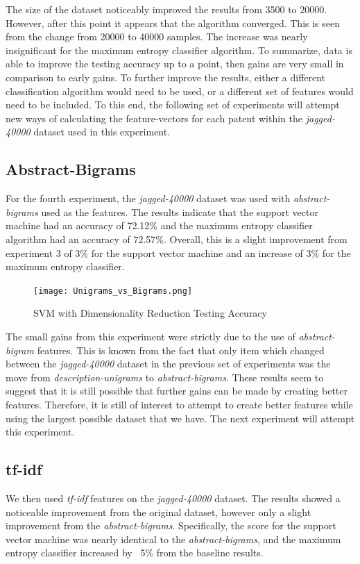 The size of the dataset noticeably improved the results from 3500 to 20000.  However, after this point it appears that the algorithm converged.  This is seen from the change from 20000 to 40000 samples.  The increase was nearly insignificant for the maximum entropy classifier algorithm.  To summarize, data is able to improve the testing accuracy up to a point, then gains are very small in comparison to early gains.  To further improve the results, either a different classification algorithm would need to be used, or a different set of features would need to be included.  To this end, the following set of experiments will attempt new ways of calculating the feature-vectors for each patent within the \emph{jagged-40000} dataset used in this experiment.

\subsection{Abstract-Bigrams}
For the fourth experiment, the \emph{jagged-40000} dataset was used with \emph{abstract-bigrams} used as the features.  The results indicate that the support vector machine had an accuracy of 72.12\% and the maximum entropy classifier algorithm had an accuracy of 72.57\%.  Overall, this is a slight improvement from experiment 3 of 3\% for the support vector machine and an increase of 3\% for the maximum entropy classifier.

\begin{figure}[!h]
\begin{center}
\caption{SVM with Dimensionality Reduction Testing Accuracy}
\texttt{[image: Unigrams\_vs\_Bigrams.png]}
\end{center}
\end{figure}

The small gains from this experiment were strictly due to the use of \emph{abstract-bigram} features.  This is known from the fact that only item which changed between the \emph{jagged-40000} dataset in the previous set of experiments was the move from \emph{description-unigrams} to \emph{abstract-bigrams}.  These results seem to suggest that it is still possible that further gains can be made by creating better features. Therefore, it is still of interest to attempt to create better features while using the largest possible dataset that we have.  The next experiment will attempt this experiment. 

\subsection{tf-idf}
We then used \emph{tf-idf} features on the \emph{jagged-40000} dataset.  The results showed a noticeable improvement from the original dataset, however only a slight improvement from the \emph{abstract-bigrams}.  Specifically, the score for the support vector machine was nearly identical to the \emph{abstract-bigrams}, and the maximum entropy classifier increased by ~5\% from the baseline results.


